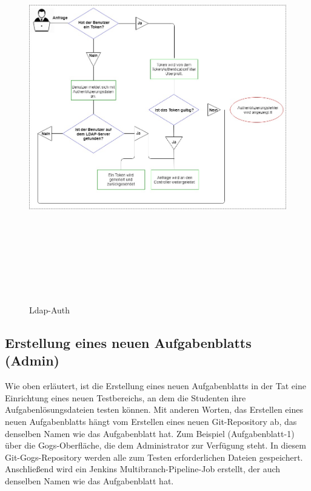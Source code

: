 \documentclass[a4paper,12pt,oneside]{book}
\begin{document}
\begin{figure}[h!]
	\begin{center}
		\includegraphics[width=15cm, height=17cm]{Ldap-Auth.jpg}
		\caption{Ldap-Auth } 
		\label{ Ldap-Auth } 
	\end{center}
\end{figure}

\subsection{Erstellung eines neuen Aufgabenblatts (Admin)}
Wie oben erläutert, ist die Erstellung eines neuen Aufgabenblatts in der Tat eine Einrichtung eines neuen Testbereichs, an dem die Studenten ihre Aufgabenlösungsdateien testen können. Mit anderen Worten, das Erstellen eines neuen Aufgabenblatts hängt vom Erstellen eines neuen Git-Repository ab, das denselben Namen wie das Aufgabenblatt hat. Zum Beispiel (Aufgabenblatt-1) über die Gogs-Oberfläche, die dem Administrator zur Verfügung steht. In diesem Git-Gogs-Repository werden alle zum Testen erforderlichen Dateien gespeichert. Anschließend wird ein Jenkins Multibranch-Pipeline-Job erstellt, der auch denselben Namen wie das Aufgabenblatt hat.
\end{document}
